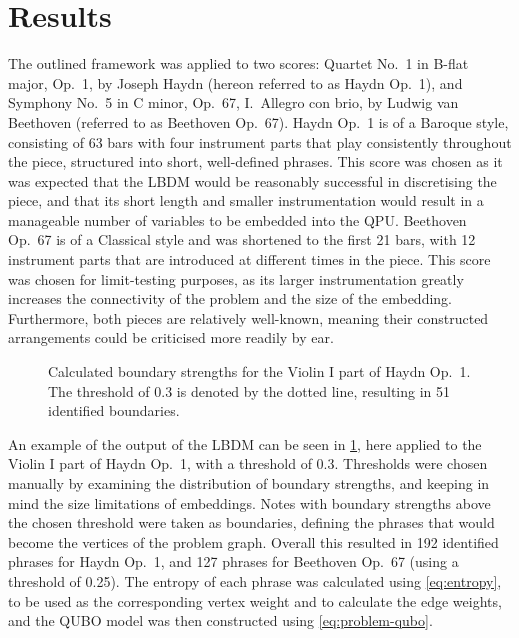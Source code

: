 \documentclass[twocolumn]{article}
\theoremstyle{definition}
\begin{document}
\section*{Results}

The outlined framework was applied to two scores: Quartet No.\ 1 in B-flat major, Op.\ 1, by Joseph Haydn (hereon referred to as Haydn Op.\ 1), and Symphony No.\ 5 in C minor, Op.\ 67, I.\ Allegro con brio, by Ludwig van Beethoven (referred to as Beethoven Op.\ 67). Haydn Op.\ 1 is of a Baroque style, consisting of 63 bars with four instrument parts that play consistently throughout the piece, structured into short, well-defined phrases. This score was chosen as it was expected that the LBDM would be reasonably successful in discretising the piece, and that its short length and smaller instrumentation would result in a manageable number of variables to be embedded into the QPU. Beethoven Op.\ 67 is of a Classical style and was shortened to the first 21 bars, with 12 instrument parts that are introduced at different times in the piece. This score was chosen for limit-testing purposes, as its larger instrumentation greatly increases the connectivity of the problem and the size of the embedding. Furthermore, both pieces are relatively well-known, meaning their constructed arrangements could be criticised more readily by ear.

\begin{figure}[ht]
    \centering\footnotesize
    
    \caption{Calculated boundary strengths for the Violin I part of Haydn Op.\ 1. The threshold of \num{0.3} is denoted by the dotted line, resulting in \num{51} identified boundaries.}
    \label{fig:phrase-extraction}
\end{figure}

An example of the output of the LBDM can be seen in \cref{fig:phrase-extraction}, here applied to the {Violin I} part of Haydn Op.\ 1, with a threshold of \num{0.3}. Thresholds were chosen manually by examining the distribution of boundary strengths, and keeping in mind the size limitations of embeddings. Notes with boundary strengths above the chosen threshold were taken as boundaries, defining the phrases that would become the vertices of the problem graph. Overall this resulted in \num{192} identified phrases for Haydn Op.\ 1, and \num{127} phrases for Beethoven Op.\ 67 (using a threshold of \num{0.25}). The entropy of each phrase was calculated using \cref{eq:entropy}, to be used as the corresponding vertex weight and to calculate the edge weights, and the QUBO model was then constructed using \cref{eq:problem-qubo}.
\end{document}
